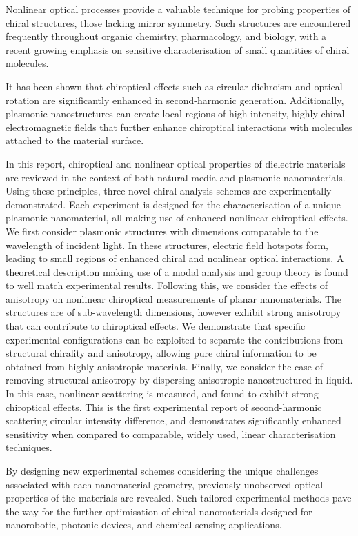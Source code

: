Nonlinear optical processes provide a valuable technique for probing properties of chiral structures, those lacking mirror symmetry. 
Such structures are encountered frequently throughout organic chemistry, pharmacology, and biology, with a recent growing emphasis on sensitive characterisation of small quantities of chiral molecules. 
	    
It has been shown that chiroptical effects such as circular dichroism and optical rotation are significantly enhanced in second-harmonic generation. 
Additionally, plasmonic nanostructures can create local regions of high intensity, highly chiral electromagnetic fields that further enhance chiroptical interactions with molecules attached to the material surface. 
	    
In this report, chiroptical and nonlinear optical properties of dielectric materials are reviewed in the context of both natural media and plasmonic nanomaterials. 
Using these principles, three novel chiral analysis schemes are experimentally demonstrated. Each experiment is designed for the characterisation of a unique plasmonic nanomaterial, all making use of enhanced nonlinear chiroptical effects. We first consider plasmonic structures with dimensions comparable to the wavelength of incident light. In these structures, electric field hotspots form, leading to small regions of enhanced chiral and nonlinear optical interactions. A theoretical description making use of a modal analysis and group theory is found to well match experimental results. Following this, we consider the effects of anisotropy on nonlinear chiroptical measurements of planar nanomaterials. The structures are of sub-wavelength dimensions, however exhibit strong anisotropy that can contribute to chiroptical effects. We demonstrate that specific experimental configurations can be exploited to separate the contributions from structural chirality and anisotropy, allowing pure chiral information to be obtained from highly anisotropic materials. Finally, we consider the case of removing structural anisotropy by dispersing anisotropic nanostructured in liquid. In this case, nonlinear scattering is measured, and found to exhibit strong chiroptical effects. This is the first experimental report of second-harmonic scattering circular intensity difference, and demonstrates significantly enhanced sensitivity when compared to comparable, widely used, linear characterisation techniques.

By designing new experimental schemes considering the unique challenges associated with each nanomaterial geometry, previously unobserved optical properties of the materials are revealed. Such tailored experimental methods pave the way for the further optimisation of chiral nanomaterials designed for nanorobotic, photonic devices, and chemical sensing applications.